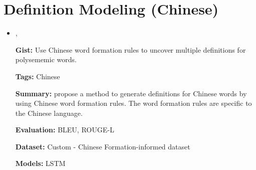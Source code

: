 \documentclass{article}[a4paper]
\newcommand{\bitem}[2]{
    \item[\cite{#1}]
        \textbf{\citetitle{#1}}

        \citeauthor{#1}, \citeyear{#1}
        \newline\newline
        {#2}
}%
\begin{document}
\section{Definition Modeling (Chinese)}
\begin{itemize}
    \bitem{zhu_multi_2019}%
    {%
        \textbf{Gist:}
        Use Chinese word formation rules to uncover multiple definitions for
        polysememic words.

        \textbf{Tags:}
        Chinese

        \textbf{Summary:}
        \citeauthor{zhu_multi_2019} propose a method to generate definitions for
        Chinese words by using Chinese word formation rules. The word formation
        rules are specific to the Chinese language.

        \textbf{Evaluation:}
        BLEU, ROUGE-L

        \textbf{Dataset:}
        Custom - Chinese Formation-informed dataset

        \textbf{Models:}
        LSTM
    }%
\end{itemize}
\end{document}
